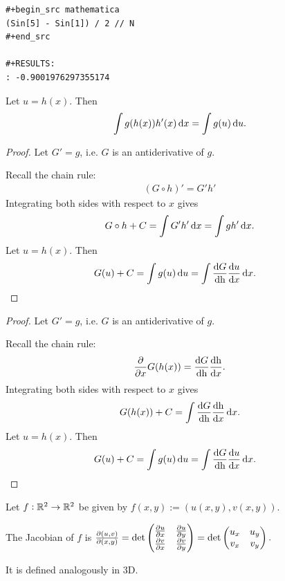 \begin{verbatim}
#+begin_src mathematica
(Sin[5] - Sin[1]) / 2 // N
#+end_src

#+RESULTS:
: -0.9001976297355174

\end{verbatim}




\begin{theorem*}
  Let $u = h(x)$. Then
  \begin{align*}
    \int g(h(x))h'(x) \dx = \int g(u) \du.
  \end{align*}
\end{theorem*}

\begin{proof}
  Let $G' = g$, i.e. $G$ is an antiderivative of $g$.

  Recall the chain rule:
  \begin{align*}
    (G \circ h)' = G' h'
  \end{align*}
  Integrating both sides with respect to $x$ gives
  \begin{align*}
    G \circ h + C = \int G' h' \dx = \int g h' \dx.
  \end{align*}
  Let $u = h(x)$. Then
  \begin{align*}
    G(u) + C &= \int g(u) \du
              = \int \frac{\dG}{\dh} \frac{\du}{\dx} \dx.
  \end{align*}
\end{proof}

\begin{proof}
  Let $G' = g$, i.e. $G$ is an antiderivative of $g$.

  Recall the chain rule:
  \begin{align*}
    \ddx G(h(x)) = \frac{\dG}{\dh} \frac{\dh}{\dx}.
  \end{align*}
  Integrating both sides with respect to $x$ gives
  \begin{align*}
    G(h(x)) + C = \int \frac{\dG}{\dh} \frac{\dh}{\dx} \dx.
  \end{align*}
  Let $u = h(x)$. Then
  \begin{align*}
    G(u) + C &= \int g(u) \du
              = \int \frac{\dG}{\dh} \frac{\du}{\dx} \dx.
  \end{align*}
\end{proof}

\begin{definition*}[Jacobian]
  Let $f:\mathbb{R}^2 \to \mathbb{R}^2$ be given by $f(x, y) := (u(x, y), v(x, y))$.

  The Jacobian of $f$ is
  $
  \frac{\partial(u, v)}{\partial(x, y)} =
  \det \begin{pmatrix}\frac{\partial u}{\partial x} & \frac{\partial u}{\partial y}\\\frac{\partial v}{\partial x} & \frac{\partial v}{\partial y}\\ \end{pmatrix}
  = \det \begin{pmatrix}u_x & u_y\\v_x & v_y\\ \end{pmatrix}.
  $

  It is defined analogously in 3D.
\end{definition*}

